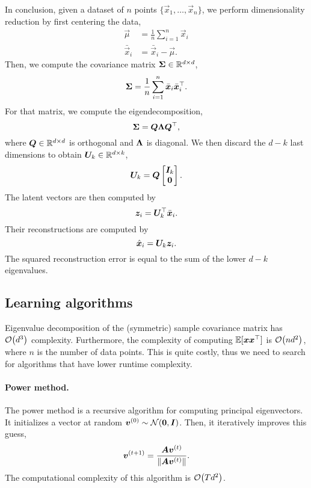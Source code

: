\begin{important}
    In conclusion, given a dataset of $n$ points $\{ \vec{x}_1, \ldots, \vec{x}_n \}$, we perform
    dimensionality reduction by first centering the data,
    \begin{align*}
        \vec{\mu}       & = \frac{1}{n} \sum_{i=1}^{n} \vec{x}_i \\
        \bar{\vec{x}}_i & = \bar{\vec{x}}_i - \vec{\mu}.
    \end{align*}
    Then, we compute the covariance matrix $\bm{\Sigma} \in \mathbb{R}^{d \times d}$, \[
        \bm{\Sigma} = \frac{1}{n} \sum_{i=1}^{n} \bar{\bm{x}}_i \bar{\bm{x}}_i^\top.
    \]
    For that matrix, we compute the eigendecomposition, \[
        \bm{\Sigma} = \bm{Q} \bm{\Lambda} \bm{Q}^\top,
    \]
    where $\bm{Q} \in \mathbb{R}^{d \times d}$ is orthogonal and $\bm{\Lambda}$ is diagonal. We then discard
    the $d-k$ last dimensions to obtain $\bm{U}_k \in \mathbb{R}^{d \times k}$, \[
        \bm{U}_k = \bm{Q} \begin{bmatrix} \bm{I}_k \\ \bm{0} \end{bmatrix}.
    \]
    The latent vectors are then computed by \[
        \bm{z}_i = \bm{U}_k^\top \bar{\bm{x}}_i.
    \]
    Their reconstructions are computed by \[
        \hat{\bm{x}}_i = \bm{U}_k \bm{z}_i.
    \]
    The squared reconstruction error is equal to the sum of the lower $d-k$ eigenvalues.
\end{important}

\subsection{Learning algorithms}

Eigenvalue decomposition of the (symmetric) sample covariance matrix has $\bigo{d^3}$ complexity.
Furthermore, the complexity of computing $\mathbb{E}[\bm{x}\bm{x}^\top]$ is $\bigo{nd^2}$, where
$n$ is the number of data points. This is quite costly, thus we
need to search for algorithms that have lower runtime complexity.

\paragraph{Power method.}

The power method is a recursive algorithm for computing principal eigenvectors. It initializes a
vector at random $\bm{v}^{(0)} \sim \mathcal{N}(\bm{0}, \bm{I})$. Then, it iteratively improves
this guess, \[
    \bm{v}^{(t+1)} = \frac{\bm{A}\bm{v}^{(t)}}{\| \bm{A} \bm{v}^{(t)} \|}.
\]
The computational complexity of this algorithm is $\bigo{Td^2}$.

